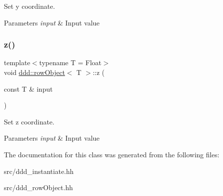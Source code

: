 Set y coordinate. 


\begin{DoxyParams}{Parameters}
{\em input} & Input value \\
\hline
\end{DoxyParams}
\mbox{\label{classddd_1_1row_object_a42c5766595f9ccb58435d97b8a9e0612}} 
\subsubsection{\texorpdfstring{z()}{z()}}
{\footnotesize\ttfamily template$<$typename T  = Float$>$ \\
void \hyperlink{classddd_1_1row_object}{ddd\+::row\+Object}$<$ T $>$\+::z (\begin{DoxyParamCaption}\item[{const T \&}]{input }\end{DoxyParamCaption})\hspace{0.3cm}{\ttfamily [inline]}}



Set z coordinate. 


\begin{DoxyParams}{Parameters}
{\em input} & Input value \\
\hline
\end{DoxyParams}


The documentation for this class was generated from the following files\+:\begin{DoxyCompactItemize}
\item 
src/ddd\+\_\+instantiate.\+hh\item 
src/ddd\+\_\+row\+Object.\+hh\end{DoxyCompactItemize}
